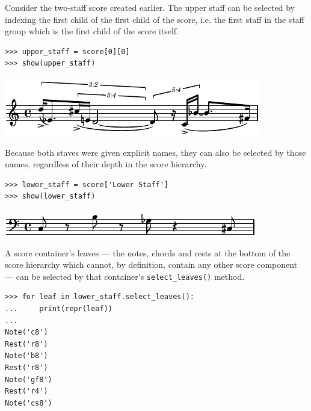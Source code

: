 \documentclass{article}
\begin{document}
Consider the two-staff score created earlier. The upper staff can be selected
by indexing the first child of the first child of the score, i.e. the first
staff in the staff group which is the first child of the score itself.

\begin{lstlisting}
>>> upper_staff = score[0][0]
>>> show(upper_staff)
\end{lstlisting}
\includegraphics{assets/lilypond-5db9f4197c984cbc17b69ed1ab39af68.pdf}

Because both staves were given explicit names, they can also be selected by
those names, regardless of their depth in the score hierarchy.

\begin{lstlisting}
>>> lower_staff = score['Lower Staff']
>>> show(lower_staff)
\end{lstlisting}
\includegraphics{assets/lilypond-fa746e527d218a814e36af2f46d314bb.pdf}

A score container's leaves --- the notes, chords and rests at the bottom of the
score hierarchy which cannot, by definition, contain any other score component
--- can be selected by that container's \texttt{select\_leaves()} method.

\begin{lstlisting}
>>> for leaf in lower_staff.select_leaves():
...     print(repr(leaf))
...
Note('c8')
Rest('r8')
Note('b8')
Rest('r8')
Note('gf8')
Rest('r4')
Note('cs8')
\end{lstlisting}
\end{document}
